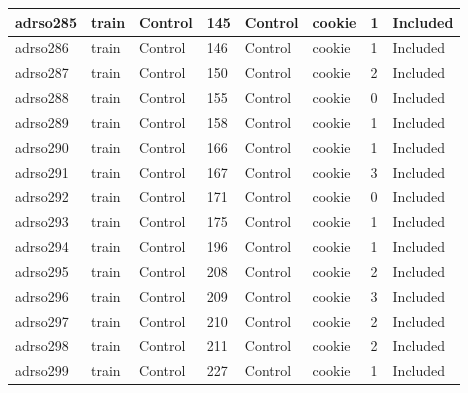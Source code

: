 \begin{center}
\begin{longtable}{|l|l|l|l|l|l|l|l|}
adrso285  & train            & Control      & 145         & Control              & cookie          & 1                & Included      \\ \hline
adrso286  & train            & Control      & 146         & Control              & cookie          & 1                & Included      \\ \hline
adrso287  & train            & Control      & 150         & Control              & cookie          & 2                & Included      \\ \hline
adrso288  & train            & Control      & 155         & Control              & cookie          & 0                & Included      \\ \hline
adrso289  & train            & Control      & 158         & Control              & cookie          & 1                & Included      \\ \hline
adrso290  & train            & Control      & 166         & Control              & cookie          & 1                & Included      \\ \hline
adrso291  & train            & Control      & 167         & Control              & cookie          & 3                & Included      \\ \hline
adrso292  & train            & Control      & 171         & Control              & cookie          & 0                & Included      \\ \hline
adrso293  & train            & Control      & 175         & Control              & cookie          & 1                & Included      \\ \hline
adrso294  & train            & Control      & 196         & Control              & cookie          & 1                & Included      \\ \hline
adrso295  & train            & Control      & 208         & Control              & cookie          & 2                & Included      \\ \hline
adrso296  & train            & Control      & 209         & Control              & cookie          & 3                & Included      \\ \hline
adrso297  & train            & Control      & 210         & Control              & cookie          & 2                & Included      \\ \hline
adrso298  & train            & Control      & 211         & Control              & cookie          & 2                & Included      \\ \hline
adrso299  & train            & Control      & 227         & Control              & cookie          & 1                & Included      \\ \hline

\end{longtable}
\end{center}
